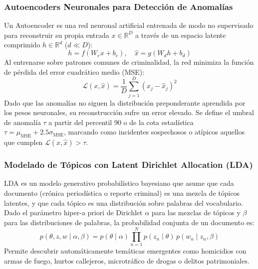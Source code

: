 \subsubsection{Autoencoders Neuronales para Detección de Anomalías}

Un Autoencoder es una red neuronal artificial entrenada de modo no supervisado para reconstruir su propia entrada $x \in \mathbb{R}^D$ a través de un espacio latente comprimido $h \in \mathbb{R}^d$ ($d \ll D$):
\begin{equation}
    h = f(W_e x + b_e), \quad \hat{x} = g(W_d h + b_d)
\end{equation}
Al entrenarse sobre patrones comunes de criminalidad, la red minimiza la función de pérdida del error cuadrático medio (MSE):
\begin{equation}
    \mathcal{L}(x, \hat{x}) = \frac{1}{D} \sum_{j=1}^D (x_j - \hat{x}_j)^2
\end{equation}
Dado que las anomalías no siguen la distribución preponderante aprendida por los pesos neuronales, su reconstrucción sufre un error elevado. Se define el umbral de anomalía $\tau$ a partir del percentil 90 o de la cota estadística $\tau = \mu_{\text{MSE}} + 2.5 \sigma_{\text{MSE}}$, marcando como incidentes sospechosos o atípicos aquellos que cumplen $\mathcal{L}(x, \hat{x}) > \tau$.

\subsubsection{Modelado de Tópicos con Latent Dirichlet Allocation (LDA)}

LDA \cite{blei2003} es un modelo generativo probabilístico bayesiano que asume que cada documento (crónica periodística o reporte criminal) es una mezcla de tópicos latentes, y que cada tópico es una distribución sobre palabras del vocabulario. Dado el parámetro hiper-a priori de Dirichlet $\alpha$ para las mezclas de tópicos y $\beta$ para las distribuciones de palabras, la probabilidad conjunta de un documento es:
\begin{equation}
    p(\theta, z, w \mid \alpha, \beta) = p(\theta \mid \alpha) \prod_{n=1}^N p(z_n \mid \theta) \, p(w_n \mid z_n, \beta)
\end{equation}
Permite descubrir automáticamente temáticas emergentes como homicidios con armas de fuego, hurtos callejeros, microtráfico de drogas o delitos patrimoniales.

